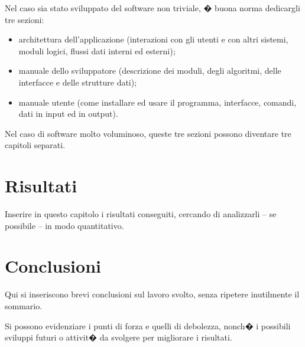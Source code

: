 \documentclass[pdfa%
,cucitura%
]{toptesi}
\begin{document}
Nel caso sia stato sviluppato del software non triviale, � buona norma dedicargli tre sezioni:
\begin{itemize}
\item architettura dell'applicazione (interazioni con gli utenti e con altri sistemi, moduli logici, flussi dati interni ed esterni);
\item manuale dello sviluppatore (descrizione dei moduli, degli algoritmi, delle interfacce e delle strutture dati);
\item manuale utente (come installare ed usare il programma, interfacce, comandi, dati in input ed in output).
\end{itemize}
Nel caso di software molto voluminoso, queste tre sezioni possono diventare tre capitoli separati.

\chapter{Risultati}

Inserire in questo capitolo i risultati conseguiti, cercando di analizzarli -- se possibile -- in modo quantitativo.


\chapter{Conclusioni}

Qui si inseriscono brevi conclusioni sul lavoro svolto, senza ripetere inutilmente il sommario.

Si possono evidenziare i punti di forza e quelli di debolezza, nonch� i possibili sviluppi futuri o attivit� da svolgere per migliorare i risultati.


\end{document}

